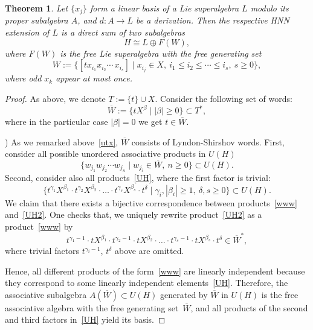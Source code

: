 \documentclass[12pt, reqno]{amsart}
\newtheorem{theorem}{Theorem}[section]
\theoremstyle{remark}
\theoremstyle{definition}
\def\g{\gamma}
\def\b{\beta}
\numberwithin{equation}{section}
\begin{document}
\begin{theorem} \label{structureHNN} 
Let  $\{ x_j \}$  form a linear basis of a Lie superalgebra $L$ modulo its proper subalgebra $A$, and $d:A\to L$  be  a derivation.
Then the respective HNN extension of $L$ is a direct sum of two subalgebras
$$
H\cong L\oplus F(W),
$$
where $F(W)$ is the free Lie superalgebra with the free generating set
\begin{equation}\label{W}
 W:=\{ [t x_{i_1}x_{i_2}\cdots\, x_{i_s}] \mid x_{i_j}\in X,\ i_1\le i_2\le \cdots\le  i_s,\ s \ge 0  \},
\end{equation}
where odd $x_k$ appear at most once.
\end{theorem}
\begin{proof}
As above, we denote $T:=\{t\}\cup X$.
Consider the following set of words:
\begin{equation}\label{wbar}
\overline W:=\{ t X^\beta \mid |\beta| \ge 0 \}\subset T^*,
\end{equation}
where in the particular case $|\b|=0$ we get $t\in \overline W$.

) As we remarked above~\eqref{utx}, $\overline W$ consists of  Lyndon-Shirshov words. 
First, consider all possible unordered associative products in $U(H)$ 
\begin{equation}\label{www}
\{w_{j_1}w_{j_2}\cdots w_{j_n} \mid w_{j_i}\in \overline W,\ n\ge 0\}\subset U(H).
\end{equation} 
Second, consider also all products~\eqref{UH}, where the first factor is trivial:
\begin{equation}\label{UH2}  
\{ t^{\gamma_1}X^{\beta_1}\cdot  t^{\gamma_2} X^{\beta_2}\cdot \ldots \cdot t^{\gamma_s} X^{\beta_s}\cdot t^{\delta} \mid \gamma_i,|\beta_i|\ge 1,\  \delta,s\ge 0\}\subset U(H).
\end{equation}
We claim that there exists a bijective correspondence between products~\eqref{www} and~\eqref{UH2}.  
One checks that, we uniquely rewrite  product~\eqref{UH2}  as a product~\eqref{www} by 
\begin{equation*} 
t^{\gamma_1-1 }\cdot tX^{\beta_1}\cdot  t^{\gamma_2-1 }\cdot tX^{\beta_2}\cdot  \ldots \cdot t^{\gamma_s-1 } \cdot tX^{\beta_s}\cdot t^\delta\in \overline W^*,
\end{equation*}
where trivial factors $t^{\g_i-1}$, $t^\delta$ above are omitted.

Hence, all different products of the form~\eqref{www} are linearly independent because they correspond to some linearly independent elements~\eqref{UH}.
Therefore, the associative subalgebra  $A(\overline  W)\subset U(H)$ generated by $\overline  W$ in $U(H)$ is the free associative algebra 
with the free generating set~$\overline  W$, and all products of the second and third factors in~\eqref{UH}  yield its basis. 



\end{proof}
\end{document}
